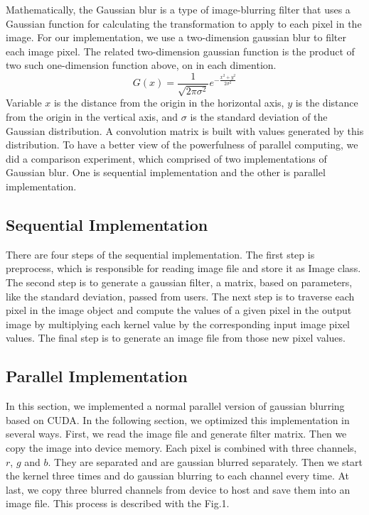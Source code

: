 \documentclass[journal,11pt,onecolumn,draftclsnofoot]{ieeeconf}  %
\begin{document}
Mathematically, the Gaussian blur is a type of image-blurring filter that uses a Gaussian function for calculating the transformation to apply to each pixel in the image.  For our implementation, we use a two-dimension gaussian blur to filter each image pixel. The related two-dimension gaussian function is the product of two such one-dimension function above, on in each dimention. 
  \[G(x) = \frac{1}{ \sqrt{2 \pi   \sigma ^{2} } } e^{ -\frac{ x^{2} +  y^{2}}{2  \sigma ^{2} }}\]
 Variable $x$ is the distance from the origin in the horizontal axis, $y$ is the distance from the origin in the vertical axis, and $\sigma$ is the standard deviation of the Gaussian distribution. A convolution matrix is built with values generated by this distribution.  
 To have a better view of the powerfulness of parallel computing, we did a comparison experiment, which comprised of two implementations of Gaussian blur. One is sequential implementation and the other is parallel implementation. 

\subsection{Sequential  Implementation}
There are four steps of the sequential implementation. The first step is preprocess, which is responsible for reading image file and store it as Image class. The second step is to generate a gaussian filter, a matrix, based on parameters, like the standard deviation,  passed from users. The next step is to traverse each pixel in the image object and compute the values of a given pixel in the output image by multiplying each kernel value by the corresponding input image pixel values. The final step is to generate an image file from those new pixel values.

\subsection{Parallel  Implementation}
In this section, we implemented a normal parallel version of gaussian blurring based on CUDA. In the following section, we optimized this implementation in several ways.  First, we read the image file and generate filter matrix. Then we copy the image into device memory. Each pixel is combined with three channels, $r$, $g$ and $b$.  They are separated and are gaussian blurred separately. Then we start the kernel three times and do gaussian blurring to each channel every time.  At last, we copy three blurred channels from device to host and save them into an image file. This process is described with the Fig.1.
\end{document}
